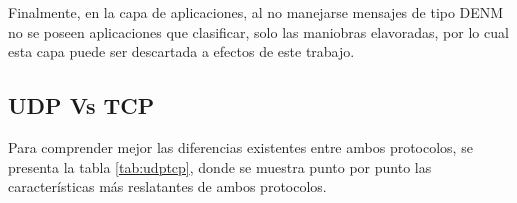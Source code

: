 \par Finalmente, en la capa de aplicaciones, al no manejarse mensajes de tipo DENM no se poseen aplicaciones que clasificar, solo las maniobras elavoradas, por lo cual esta capa puede ser descartada a efectos de este trabajo.\\
	            
\subsection{UDP Vs TCP}
\par Para comprender mejor las diferencias existentes entre ambos protocolos, se presenta la tabla \ref{tab:udptcp}, donde se muestra punto por punto las características más reslatantes de ambos protocolos.\\  

